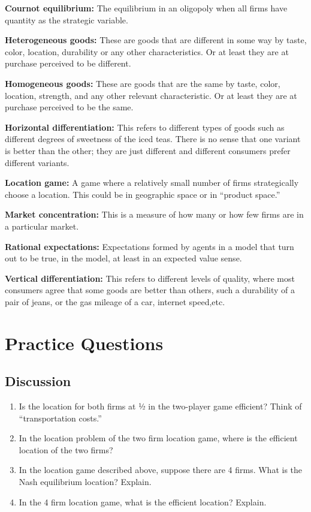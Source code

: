 \documentclass[
]{book}
\providecommand{\tightlist}{%
  \setlength{\itemsep}{0pt}\setlength{\parskip}{0pt}}
\begin{document}
\textbf{Cournot equilibrium:} The equilibrium in an oligopoly when all firms have quantity as the strategic variable.

\textbf{Heterogeneous goods:} These are goods that are different in some way by taste, color, location, durability or any other characteristics. Or at least they are at purchase perceived to be different.

\textbf{Homogeneous goods:} These are goods that are the same by taste, color, location, strength, and any other relevant characteristic. Or at least they are at purchase perceived to be the same.

\textbf{Horizontal differentiation:} This refers to different types of goods such as different degrees of sweetness of the iced teas. There is no sense that one variant is better than the other; they are just different and different consumers prefer different variants.

\textbf{Location game:} A game where a relatively small number of firms strategically choose a location. This could be in geographic space or in ``product space.''

\textbf{Market concentration:} This is a measure of how many or how few firms are in a particular market.

\textbf{Rational expectations:} Expectations formed by agents in a model that turn out to be true, in the model, at least in an expected value sense.

\textbf{Vertical differentiation:} This refers to different levels of quality, where most consumers agree that some goods are better than others, such a durability of a pair of jeans, or the gas mileage of a car, internet speed,etc.

\hypertarget{practice-questions-8}{%
\section{Practice Questions}\label{practice-questions-8}}

\hypertarget{discussion-8}{%
\subsection{Discussion}\label{discussion-8}}

\begin{enumerate}
\def\labelenumi{\arabic{enumi}.}
\tightlist
\item
  Is the location for both firms at ½ in the two-player game efficient? Think of ``transportation costs.''
\item
  In the location problem of the two firm location game, where is the efficient location of the two firms?
\item
  In the location game described above, suppose there are 4 firms. What is the Nash equilibrium location? Explain.
\item
  In the 4 firm location game, what is the efficient location? Explain.
\end{enumerate}
\end{document}
